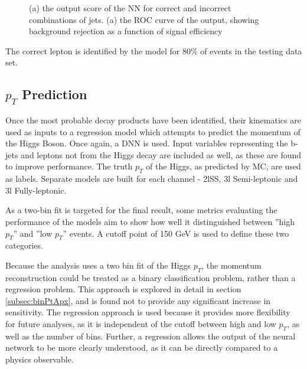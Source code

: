 \begin{figure}[h!]
  \label{fig:higgs3lFresults}
  \caption{(a) the output score of the NN for correct and incorrect combinations of jets. (a) the ROC curve of the output, showing background rejection as a function of signal efficiency}
\end{figure} 

The correct lepton is identified by the model for 80\% of events in the testing data set.


\subsection{$p_T$ Prediction}
\label{sec:ptReco}

Once the most probable decay products have been identified, their kinematics are used as inputs to a regression model which attempts to predict the momentum of the Higgs Boson. Once again, a DNN is used. Input variables representing the b-jets and leptons not from the Higgs decay are included as well, as these are found to improve performance. The truth $p_T$ of the Higgs, as predicted by MC, are used as labels. Separate models are built for each channel - 2lSS, 3l Semi-leptonic and 3l Fully-leptonic.

As a two-bin fit is targeted for the final result, some metrics evaluating the performance of the models aim to show how well it distinguished between ''high $p_T$'' and ''low $p_T$'' events. A cutoff point of 150 GeV is used to define these two categories.

Because the analysis uses a two bin fit of the Higgs $p_T$, the momentum reconstruction could be treated as a binary classification problem, rather than a regression problem. This approach is explored in detail in section \ref{subsec:binPtApx}, and is found not to provide any significant increase in sensitivity. The regression approach is used because it provides more flexibility for future analyses, as it is independent of the cutoff between high and low $p_T$, as well as the number of bins. Further, a regression allows the output of the neural network to be more clearly understood, as it can be directly compared to a physics observable.

